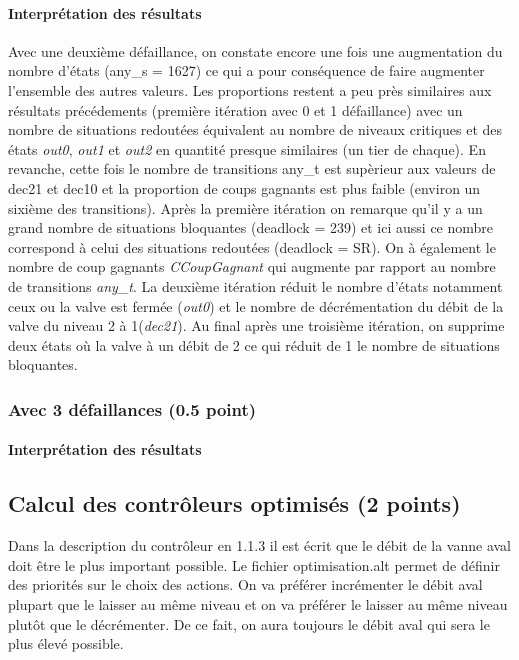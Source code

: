 \documentclass[a4paper]{book}
\begin{document}
\paragraph{Interprétation des résultats}
Avec une deuxième défaillance, on constate encore une fois une augmentation du nombre d'états (any\_s = 1627) ce qui a pour conséquence de faire augmenter l'ensemble 
des autres valeurs. Les proportions restent a peu près similaires aux résultats précédements (première itération avec 0 et 1 défaillance) avec un nombre de situations 
redoutées équivalent au nombre de niveaux critiques et des états  \textit{out0},  \textit{out1} et  \textit{out2} en quantité presque similaires (un tier de chaque). En revanche, 
cette fois le nombre de transitions any\_t est supèrieur aux valeurs de dec21 et dec10 et la proportion de coups gagnants est plus faible (environ un sixième des 
transitions). 
Après la première itération on remarque qu'il y a un grand nombre de situations bloquantes (deadlock = 239) et ici aussi ce nombre correspond à celui des 
situations redoutées (deadlock = SR). On à également le nombre de coup gagnants \textit{CCoupGagnant} qui augmente par rapport au nombre de transitions \textit{any\_t}. 
La deuxième itération réduit le nombre d'états notamment ceux ou la valve est fermée (\textit{out0}) et le nombre de décrémentation du débit de la valve du niveau 2 à 
1(\textit{dec21}). 
Au final après une troisième itération, on supprime deux états où la valve à un débit de 2 ce qui réduit de 1 le nombre de situations bloquantes.

\subsubsection{Avec 3 défaillances (0.5 point)}




%
\paragraph{Interprétation des résultats}

\subsection{Calcul des contrôleurs optimisés (2 points)}

Dans la description du contrôleur en 1.1.3 il est écrit que le débit de la vanne aval doit être le plus important possible.
Le fichier optimisation.alt permet de définir des priorités sur le choix des actions. On va préférer incrémenter le débit aval 
plupart que le laisser au même niveau et on va préférer le laisser au même niveau plutôt que le décrémenter. De ce fait, on aura 
toujours le débit aval qui sera le plus élevé possible.
\end{document}
